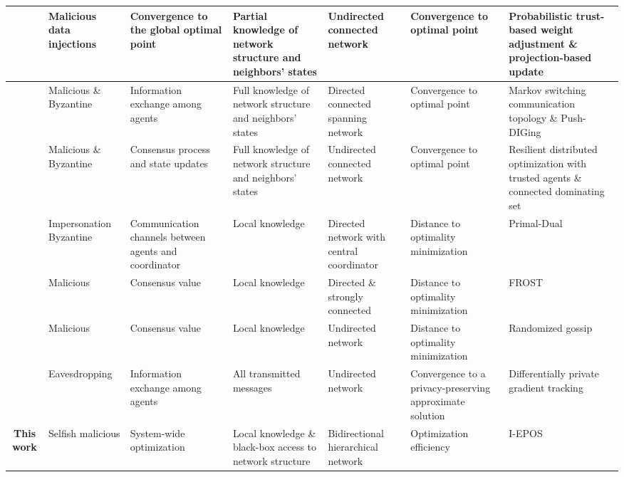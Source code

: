 \documentclass[journal]{IEEEtran}
\begin{document}
\begin{table*}[htbp]
\begin{adjustbox}{width=\textwidth}
\begin{tabular}{cp{1.5cm}p{1.5cm}p{3.5cm}p{2.5cm}p{2.5cm}p{3cm}}
      \midrule
      \cite{yemini2022resilience} & Malicious data injections & Convergence to the global optimal point & Partial knowledge of network structure and neighbors' states & Undirected connected network & Convergence to optimal point & Probabilistic trust-based weight adjustment \& projection-based update \\
      \midrule
      \cite{du2023distributed} & Malicious \& Byzantine & Information exchange among agents & Full knowledge of network structure and neighbors' states & Directed connected spanning network & Convergence to optimal point & Markov switching communication topology \& Push-DIGing \\
      \midrule
      \cite{zhao2019resilient} & Malicious \& Byzantine & Consensus process and state updates & Full knowledge of network structure and neighbors' states & Undirected connected network & Convergence to optimal point & Resilient distributed optimization with trusted agents \& connected dominating set \\
      \midrule
      \cite{uribe2019resilient, turan2020resilient} & Impersonation Byzantine & Communication channels between agents and coordinator & Local knowledge & Directed network with central coordinator & Distance to optimality minimization & Primal-Dual \\
      \midrule
      \cite{ravi2019case} & Malicious & Consensus value & Local knowledge & Directed \& strongly connected & Distance to optimality minimization & FROST \\
      \midrule
      \cite{gentz2016data} & Malicious & Consensus value & Local knowledge & Undirected network & Distance to optimality minimization & Randomized gossip \\
      \midrule
      \cite{ding2018consensus, ding2021differentially} & Eavesdropping & Information exchange among agents & All transmitted messages & Undirected network & Convergence to a privacy-preserving approximate solution & Differentially private gradient tracking  \\
    \midrule
      \textbf{This work} & Selfish malicious & System-wide optimization& Local knowledge \& black-box access to network structure & Bidirectional hierarchical network & Optimization efficiency & I-EPOS \\    
      \bottomrule
    \end{tabular} 
  \end{adjustbox}
  \label{t1}
\end{table*}
\end{document}

